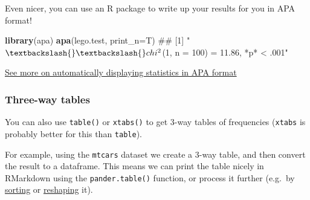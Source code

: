 \documentclass[]{article}
\newenvironment{Shaded}{\begin{snugshade}}{\end{snugshade}}
\newcommand{\KeywordTok}[1]{\textcolor[rgb]{0.13,0.29,0.53}{\textbf{#1}}}
\newcommand{\DataTypeTok}[1]{\textcolor[rgb]{0.13,0.29,0.53}{#1}}
\newcommand{\StringTok}[1]{\textcolor[rgb]{0.31,0.60,0.02}{#1}}
\newcommand{\CommentTok}[1]{\textcolor[rgb]{0.56,0.35,0.01}{\textit{#1}}}
\newcommand{\OperatorTok}[1]{\textcolor[rgb]{0.81,0.36,0.00}{\textbf{#1}}}
\newcommand{\NormalTok}[1]{#1}
\theoremstyle{definition}
\theoremstyle{definition}
\theoremstyle{definition}
\theoremstyle{remark}
\begin{document}
\begin{Shaded}
\end{Shaded}

Even nicer, you can use an R package to write up your results for you in
APA format!

\begin{Shaded}
\begin{Highlighting}[]
\KeywordTok{library}\NormalTok{(apa)}
\KeywordTok{apa}\NormalTok{(lego.test, }\DataTypeTok{print_n=}\NormalTok{T)}
\NormalTok{## [1] "$\textbackslash{}\textbackslash{}chi^2$(1, n = 100) = 11.86, *p* < .001"}
\end{Highlighting}
\end{Shaded}

\protect\hyperlink{apa-output}{See more on automatically displaying
statistics in APA format}

\subsubsection*{Three-way tables}\label{three-way-tables}

You can also use \texttt{table()} or \texttt{xtabs()} to get 3-way
tables of frequencies (\texttt{xtabs} is probably better for this than
\texttt{table}).

For example, using the \texttt{mtcars} dataset we create a 3-way table,
and then convert the result to a dataframe. This means we can print the
table nicely in RMarkdown using the \texttt{pander.table()} function, or
process it further (e.g.~by \protect\hyperlink{sorting}{sorting} or
\protect\hyperlink{reshaping}{reshaping} it).

\begin{Shaded}
\end{Shaded}
\end{document}
